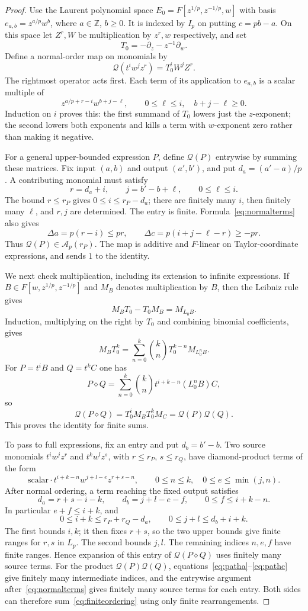 \documentclass{article}
\newcommand{\Af}{\mathcal A}
\begin{document}
\begin{proof}
Use the Laurent polynomial space $E_0=F[z^{1/p},z^{-1/p},w]$ with basis $e_{a,b}=z^{a/p}w^b$, where $a\in\mathbb Z$, $b\geq0$. It is indexed by $I_p$ on putting $c=pb-a$. On this space let $Z^r,W$ be multiplication by $z^r,w$ respectively, and set
\[
 T_0=-\partial_z-z^{-1}\partial_w.
\]
Define a normal-order map on monomials by
\[
 \mathcal Q(t^iw^jz^r)=T_0^iW^jZ^r.
 \tag{6.7}\label{eq:normalmap}
\]
The rightmost operator acts first. Each term of its application to $e_{a,b}$ is a scalar multiple of
\[
 z^{a/p+r-i}w^{b+j-\ell},\qquad
 0\leq\ell\leq i,\quad b+j-\ell\geq0.
 \tag{6.8}\label{eq:normalterms}
\]
Induction on $i$ proves this: the first summand of $T_0$ lowers just the $z$-exponent; the second lowers both exponents and kills a term with $w$-exponent zero rather than making it negative.

For a general upper-bounded expression $P$, define $\mathcal Q(P)$ entrywise by summing these matrices. Fix input $(a,b)$ and output $(a',b')$, and put $d_a=(a'-a)/p$. A contributing monomial must satisfy
\[
 r=d_a+i,\qquad j=b'-b+\ell,\qquad 0\leq\ell\leq i.
\]
The bound $r\leq r_P$ gives $0\leq i\leq r_P-d_a$; there are finitely many $i$, then finitely many $\ell$, and $r,j$ are determined. The entry is finite. Formula~\eqref{eq:normalterms} also gives
\[
 \Delta a=p(r-i)\leq pr,\qquad
 \Delta c=p(i+j-\ell-r)\geq-pr.
\]
Thus $\mathcal Q(P)\in\Af_p(r_P)$. The map is additive and $F$-linear on Taylor-coordinate expressions, and sends $1$ to the identity.

We next check multiplication, including its extension to infinite expressions. If $B\in F[w,z^{1/p},z^{-1/p}]$ and $M_B$ denotes multiplication by $B$, then the Leibniz rule gives
\[
 M_BT_0-T_0M_B=M_{L_0B}.
\]
Induction, multiplying on the right by $T_0$ and combining binomial coefficients, gives
\[
 M_BT_0^k=\sum_{n=0}^k\binom kn T_0^{k-n}M_{L_0^nB}.
\]
For $P=t^iB$ and $Q=t^kC$ one has
\[
 P\diamond Q=\sum_{n=0}^k\binom kn t^{i+k-n}(L_0^nB)C,
\]
so
\[
 \mathcal Q(P\diamond Q)
 =T_0^iM_BT_0^kM_C=\mathcal Q(P)\mathcal Q(Q).
 \tag{6.9}\label{eq:finiteordering}
\]
This proves the identity for finite sums.

To pass to full expressions, fix an entry and put $d_b=b'-b$. Two source monomials $t^iw^jz^r$ and $t^kw^lz^s$, with $r\leq r_P$, $s\leq r_Q$, have diamond-product terms of the form
\[
 \text{scalar}\cdot t^{i+k-n}w^{j+l-e}z^{r+s-n},
 \qquad 0\leq n\leq k,\quad0\leq e\leq\min(j,n).
\]
After normal ordering, a term reaching the fixed output satisfies
\[
 d_a=r+s-i-k,\qquad d_b=j+l-e-f,
 \qquad0\leq f\leq i+k-n.
\]
In particular $e+f\leq i+k$, and
\[
 0\leq i+k\leq r_P+r_Q-d_a,\qquad
 0\leq j+l\leq d_b+i+k.
\]
The first bounds $i,k$; it then fixes $r+s$, so the two upper bounds give finite ranges for $r,s$ in $L_p$. The second bounds $j,l$. The remaining indices $n,e,f$ have finite ranges. Hence expansion of this entry of $\mathcal Q(P\diamond Q)$ uses finitely many source terms. For the product $\mathcal Q(P)\mathcal Q(Q)$, equations~\eqref{eq:patha}--\eqref{eq:pathc} give finitely many intermediate indices, and the entrywise argument after~\eqref{eq:normalterms} gives finitely many source terms for each entry. Both sides can therefore sum~\eqref{eq:finiteordering} using only finite rearrangements.


\end{proof}
\end{document}
